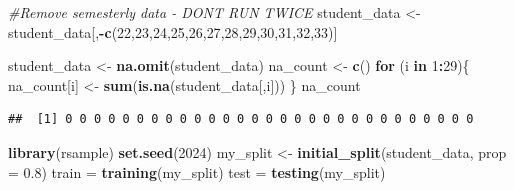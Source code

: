 \documentclass[
]{article}
\newenvironment{Shaded}{\begin{snugshade}}{\end{snugshade}}
\newcommand{\AttributeTok}[1]{\textcolor[rgb]{0.13,0.29,0.53}{#1}}
\newcommand{\CommentTok}[1]{\textcolor[rgb]{0.56,0.35,0.01}{\textit{#1}}}
\newcommand{\ControlFlowTok}[1]{\textcolor[rgb]{0.13,0.29,0.53}{\textbf{#1}}}
\newcommand{\DecValTok}[1]{\textcolor[rgb]{0.00,0.00,0.81}{#1}}
\newcommand{\FloatTok}[1]{\textcolor[rgb]{0.00,0.00,0.81}{#1}}
\newcommand{\FunctionTok}[1]{\textcolor[rgb]{0.13,0.29,0.53}{\textbf{#1}}}
\newcommand{\NormalTok}[1]{#1}
\newcommand{\OtherTok}[1]{\textcolor[rgb]{0.56,0.35,0.01}{#1}}
\newcommand{\SpecialCharTok}[1]{\textcolor[rgb]{0.81,0.36,0.00}{\textbf{#1}}}
\begin{document}
\begin{Shaded}
\begin{Highlighting}[]
\CommentTok{\#Remove semesterly data {-} DON\textquotesingle{}T RUN TWICE}
\NormalTok{student\_data }\OtherTok{\textless{}{-}}\NormalTok{ student\_data[,}\SpecialCharTok{{-}}\FunctionTok{c}\NormalTok{(}\DecValTok{22}\NormalTok{,}\DecValTok{23}\NormalTok{,}\DecValTok{24}\NormalTok{,}\DecValTok{25}\NormalTok{,}\DecValTok{26}\NormalTok{,}\DecValTok{27}\NormalTok{,}\DecValTok{28}\NormalTok{,}\DecValTok{29}\NormalTok{,}\DecValTok{30}\NormalTok{,}\DecValTok{31}\NormalTok{,}\DecValTok{32}\NormalTok{,}\DecValTok{33}\NormalTok{)]}
\end{Highlighting}
\end{Shaded}

\begin{Shaded}
\begin{Highlighting}[]
\NormalTok{student\_data }\OtherTok{\textless{}{-}} \FunctionTok{na.omit}\NormalTok{(student\_data)}
\NormalTok{na\_count }\OtherTok{\textless{}{-}} \FunctionTok{c}\NormalTok{()}
\ControlFlowTok{for}\NormalTok{ (i }\ControlFlowTok{in} \DecValTok{1}\SpecialCharTok{:}\DecValTok{29}\NormalTok{)\{}
\NormalTok{  na\_count[i] }\OtherTok{\textless{}{-}} \FunctionTok{sum}\NormalTok{(}\FunctionTok{is.na}\NormalTok{(student\_data[,i]))}
\NormalTok{\}}
\NormalTok{na\_count}
\end{Highlighting}
\end{Shaded}

\begin{verbatim}
##  [1] 0 0 0 0 0 0 0 0 0 0 0 0 0 0 0 0 0 0 0 0 0 0 0 0 0 0 0 0 0
\end{verbatim}

\begin{Shaded}
\end{Shaded}

\begin{Shaded}
\begin{Highlighting}[]
\FunctionTok{library}\NormalTok{(rsample)}
\FunctionTok{set.seed}\NormalTok{(}\DecValTok{2024}\NormalTok{)}
\NormalTok{my\_split }\OtherTok{\textless{}{-}} \FunctionTok{initial\_split}\NormalTok{(student\_data, }\AttributeTok{prop =} \FloatTok{0.8}\NormalTok{)}
\NormalTok{train }\OtherTok{=} \FunctionTok{training}\NormalTok{(my\_split)}
\NormalTok{test }\OtherTok{=} \FunctionTok{testing}\NormalTok{(my\_split)}
\end{Highlighting}
\end{Shaded}
\end{document}
